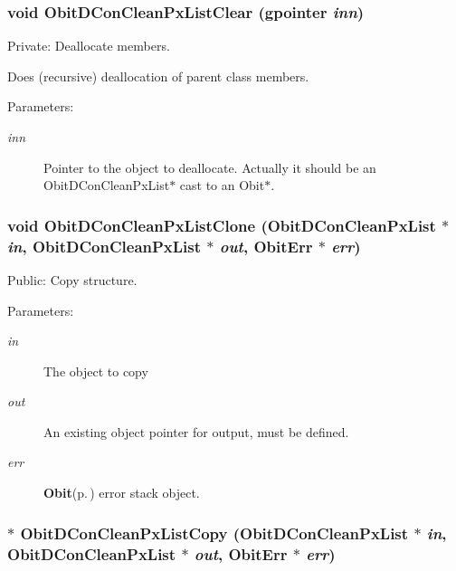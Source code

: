 \subsubsection{\setlength{\rightskip}{0pt plus 5cm}void Obit\-DCon\-Clean\-Px\-List\-Clear (gpointer {\em inn})}\label{ObitDConCleanPxList_8c_a4}


Private: Deallocate members. 

Does (recursive) deallocation of parent class members. \begin{Desc}
\item[Parameters:]
\begin{description}
\item[{\em inn}]Pointer to the object to deallocate. Actually it should be an Obit\-DCon\-Clean\-Px\-List$\ast$ cast to an Obit$\ast$. \end{description}
\end{Desc}
\subsubsection{\setlength{\rightskip}{0pt plus 5cm}void Obit\-DCon\-Clean\-Px\-List\-Clone ({\bf Obit\-DCon\-Clean\-Px\-List} $\ast$ {\em in}, {\bf Obit\-DCon\-Clean\-Px\-List} $\ast$ {\em out}, {\bf Obit\-Err} $\ast$ {\em err})}\label{ObitDConCleanPxList_8c_a13}


Public: Copy structure. 

\begin{Desc}
\item[Parameters:]
\begin{description}
\item[{\em in}]The object to copy \item[{\em out}]An existing object pointer for output, must be defined. \item[{\em err}]{\bf Obit}{\rm (p.\,\pageref{structObit})} error stack object. \end{description}
\end{Desc}
\subsubsection{$\ast$ Obit\-DCon\-Clean\-Px\-List\-Copy ({\bf Obit\-DCon\-Clean\-Px\-List} $\ast$ {\em in}, {\bf Obit\-DCon\-Clean\-Px\-List} $\ast$ {\em out}, {\bf Obit\-Err} $\ast$ {\em err})}\label{ObitDConCleanPxList_8c_a12}


